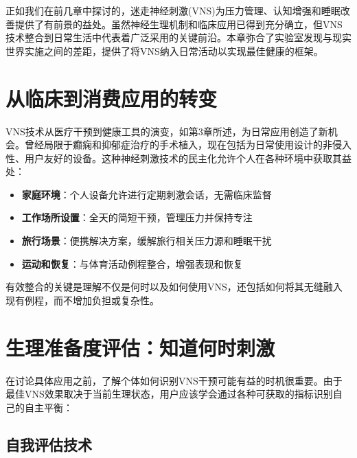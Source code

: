 \documentclass[
  Letterpaper,
]{scrbook}
\providecommand{\tightlist}{%
  \setlength{\itemsep}{0pt}\setlength{\parskip}{0pt}}\usepackage{longtable,booktabs,array}
\begin{document}
正如我们在前几章中探讨的，迷走神经刺激(VNS)为压力管理、认知增强和睡眠改善提供了有前景的益处。虽然神经生理机制和临床应用已得到充分确立，但VNS技术整合到日常生活中代表着广泛采用的关键前沿。本章弥合了实验室发现与现实世界实施之间的差距，提供了将VNS纳入日常活动以实现最佳健康的框架。

\section{从临床到消费应用的转变}\label{ux4eceux4e34ux5e8aux5230ux6d88ux8d39ux5e94ux7528ux7684ux8f6cux53d8}

VNS技术从医疗干预到健康工具的演变，如第3章所述，为日常应用创造了新机会。曾经局限于癫痫和抑郁症治疗的手术植入，现在包括为日常使用设计的非侵入性、用户友好的设备。这种神经刺激技术的民主化允许个人在各种环境中获取其益处：

\begin{itemize}
\tightlist
\item
  \textbf{家庭环境}：个人设备允许进行定期刺激会话，无需临床监督
\item
  \textbf{工作场所设置}：全天的简短干预，管理压力并保持专注
\item
  \textbf{旅行场景}：便携解决方案，缓解旅行相关压力源和睡眠干扰
\item
  \textbf{运动和恢复}：与体育活动例程整合，增强表现和恢复
\end{itemize}

有效整合的关键是理解不仅是何时以及如何使用VNS，还包括如何将其无缝融入现有例程，而不增加负担或复杂性。

\section{生理准备度评估：知道何时刺激}\label{ux751fux7406ux51c6ux5907ux5ea6ux8bc4ux4f30ux77e5ux9053ux4f55ux65f6ux523aux6fc0}

在讨论具体应用之前，了解个体如何识别VNS干预可能有益的时机很重要。由于最佳VNS效果取决于当前生理状态，用户应该学会通过各种可获取的指标识别自己的自主平衡：

\subsection{自我评估技术}\label{ux81eaux6211ux8bc4ux4f30ux6280ux672f}
\end{document}
